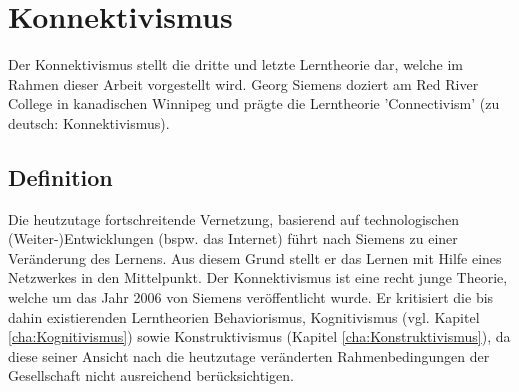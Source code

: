 \chapter{Konnektivismus}
\label{cha:Konnektivismus}
Der Konnektivismus stellt die dritte und letzte Lerntheorie dar, welche im Rahmen dieser Arbeit vorgestellt wird. Georg Siemens doziert am Red River College in kanadischen Winnipeg und prägte die Lerntheorie 'Connectivism' (zu deutsch: Konnektivismus).\cite[S. 159]{Erpenbeck.2007}

\section{Definition}
Die heutzutage fortschreitende Vernetzung, basierend auf technologischen (Weiter-)Entwicklungen (bspw. das Internet) führt nach Siemens zu einer Veränderung des Lernens. Aus diesem Grund stellt er das Lernen mit Hilfe eines Netzwerkes in den Mittelpunkt. Der Konnektivismus ist eine recht junge Theorie, welche um das Jahr 2006 von Siemens veröffentlicht wurde. Er kritisiert die bis dahin existierenden Lerntheorien Behaviorismus, Kognitivismus (vgl. Kapitel \ref{cha:Kognitivismus}) sowie Konstruktivismus (Kapitel \ref{cha:Konstruktivismus}), da diese seiner Ansicht nach die heutzutage veränderten Rahmenbedingungen der Gesellschaft nicht ausreichend berücksichtigen.\cite[S.47 f.]{Kuhlmann.2008} 

